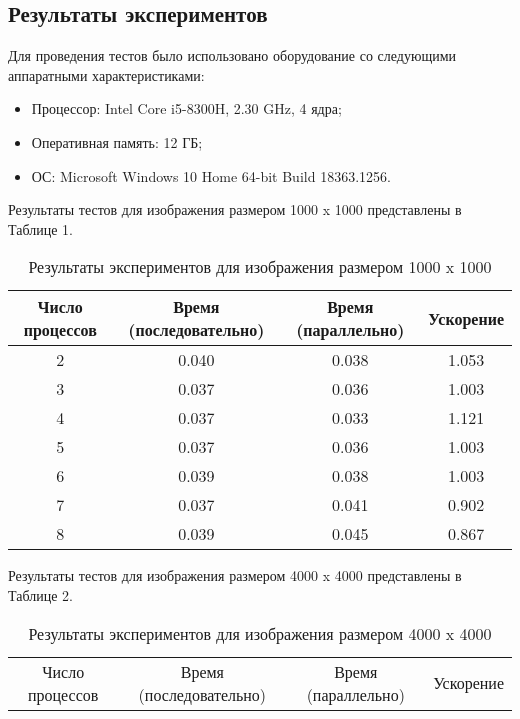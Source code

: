\documentclass{report}
\begin{document}
\begin{itemize}
\begin{itemize}
	\section*{Результаты экспериментов}
	\par Для проведения тестов было использовано оборудование со следующими аппаратными характеристиками:
	\begin{itemize}
		\item Процессор: Intel Core i5-8300H, 2.30 GHz, 4 ядра;
		\item Оперативная память: 12 ГБ;
		\item ОС: Microsoft Windows 10 Home 64-bit Build 18363.1256.
	\end{itemize}
	\par Результаты тестов для изображения размером 1000 x 1000 представлены в Таблице 1.
	\begin{table}[!h]
		\caption{Результаты экспериментов для изображения размером 1000 x 1000}
		\centering
		\begin{tabular}{|c|c|c|c|}
            \hline
			Число процессов & Время (последовательно) & Время (параллельно) & Ускорение  \\
            \hline
			2        & 0.040           & 0.038       & 1.053      \\
			3        & 0.037           & 0.036       & 1.003      \\
			4        & 0.037           & 0.033       & 1.121      \\
			5        & 0.037           & 0.036       & 1.003      \\
			6        & 0.039           & 0.038       & 1.003      \\
			7        & 0.037           & 0.041       & 0.902      \\
			8        & 0.039           & 0.045       & 0.867      \\
            \hline
		\end{tabular}
	\end{table}
	\par Результаты тестов для изображения размером 4000 x 4000 представлены в Таблице 2.
	\begin{table}[!h]
		\caption{Результаты экспериментов для изображения размером 4000 x 4000}
		\centering
		\begin{tabular}{|c|c|c|c|}
            \hline
			Число процессов & Время (последовательно) & Время (параллельно) & Ускорение  \\

\end{tabular}
\end{table}
\end{itemize}
\end{itemize}
\end{document}
